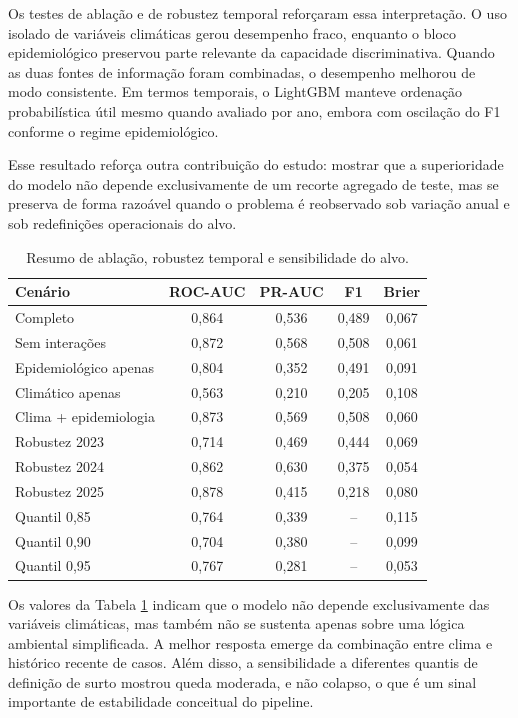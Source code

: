 Os testes de abla\c{c}\~ao e de robustez temporal refor\c{c}aram essa interpreta\c{c}\~ao. O uso isolado de vari\'aveis clim\'aticas gerou desempenho fraco, enquanto o bloco epidemiol\'ogico preservou parte relevante da capacidade discriminativa. Quando as duas fontes de informa\c{c}\~ao foram combinadas, o desempenho melhorou de modo consistente. Em termos temporais, o LightGBM manteve ordena\c{c}\~ao probabil\'istica \'util mesmo quando avaliado por ano, embora com oscila\c{c}\~ao do F1 conforme o regime epidemiol\'ogico.

Esse resultado refor\c{c}a outra contribui\c{c}\~ao do estudo: mostrar que a superioridade do modelo n\~ao depende exclusivamente de um recorte agregado de teste, mas se preserva de forma razo\'avel quando o problema \'e reobservado sob varia\c{c}\~ao anual e sob redefini\c{c}\~oes operacionais do alvo.

\begin{table}[H]
\centering
\caption{Resumo de abla\c{c}\~ao, robustez temporal e sensibilidade do alvo.}
\label{tab:ablation}
\tabelafonte
\begin{tabular}{lcccc}
\toprule
Cen\'ario & ROC-AUC & PR-AUC & F1 & Brier \\
\midrule
Completo & 0,864 & 0,536 & 0,489 & 0,067 \\
Sem intera\c{c}\~oes & 0,872 & 0,568 & 0,508 & 0,061 \\
Epidemiol\'ogico apenas & 0,804 & 0,352 & 0,491 & 0,091 \\
Clim\'atico apenas & 0,563 & 0,210 & 0,205 & 0,108 \\
Clima + epidemiologia & 0,873 & 0,569 & 0,508 & 0,060 \\
\midrule
Robustez 2023 & 0,714 & 0,469 & 0,444 & 0,069 \\
Robustez 2024 & 0,862 & 0,630 & 0,375 & 0,054 \\
Robustez 2025 & 0,878 & 0,415 & 0,218 & 0,080 \\
\midrule
Quantil 0,85 & 0,764 & 0,339 & -- & 0,115 \\
Quantil 0,90 & 0,704 & 0,380 & -- & 0,099 \\
Quantil 0,95 & 0,767 & 0,281 & -- & 0,053 \\
\bottomrule
\end{tabular}
\end{table}

Os valores da Tabela \ref{tab:ablation} indicam que o modelo n\~ao depende exclusivamente das vari\'aveis clim\'aticas, mas tamb\'em n\~ao se sustenta apenas sobre uma l\'ogica ambiental simplificada. A melhor resposta emerge da combina\c{c}\~ao entre clima e hist\'orico recente de casos. Al\'em disso, a sensibilidade a diferentes quantis de defini\c{c}\~ao de surto mostrou queda moderada, e n\~ao colapso, o que \'e um sinal importante de estabilidade conceitual do pipeline.

